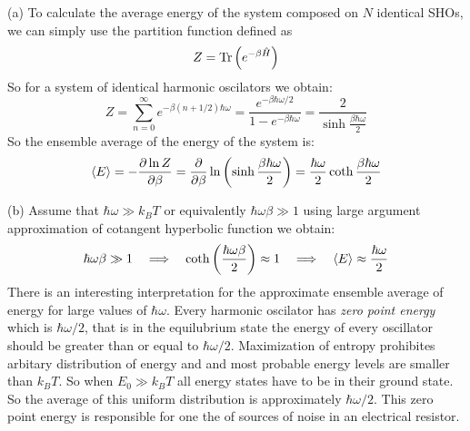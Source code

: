 \begin{homeworkProblem}

\begin{homeworkSection}{(a)}
To calculate the average energy of the system composed on $N$ identical SHOs, we can simply use the partition function defined as 
\begin{equation*}
Z=\operatorname{Tr}\left(e^{-\beta\Hat{H}}\right)
\end{equation*}
So for a system of identical harmonic oscilators we obtain:
\begin{equation}
Z=\sum_{n=0}^{\infty}e^{-\beta (n+1/2)\hbar \omega}=\frac{e^{-\beta \hbar \omega/2}}{1-e^{-\beta \hbar \omega}}
=\frac{2}{\sinh\frac{\beta\hbar\omega}{2}}
\end{equation} 
So the ensemble average of the energy of the system is:
\begin{equation}
\langle E\rangle=-\dfrac{\partial \ln Z}{\partial \beta}=\frac{\partial}{\partial \beta}\ln\left(\sinh\frac{\beta\hbar\omega}{2}\right)=\frac{\hbar\omega}{2}\coth\frac{\beta\hbar\omega}{2}
\end{equation} 

\end{homeworkSection}
\begin{homeworkSection}{(b)}
Assume that $\hbar\omega\gg k_BT$ or equivalently $\hbar\omega\beta\gg 1$ using large argument approximation of cotangent hyperbolic function we obtain:
\begin{equation}
\hbar\omega\beta\gg 1\quad\Longrightarrow\quad \coth\left(\frac{\hbar\omega\beta}{2}\right)\approx 1\quad\Longrightarrow\quad \langle E\rangle \approx\frac{\hbar\omega}{2}
\end{equation} 
There is an interesting interpretation for the approximate ensemble average of energy for large values of $\hbar\omega$. Every harmonic oscilator has \textit{zero point energy} which is $\hbar\omega/2$, that is in the equilubrium state the energy of every oscillator should be greater than or equal to  $\hbar\omega/2$. Maximization of entropy prohibites arbitary distribution of energy and  and most probable energy levels are smaller than $k_BT$. So when $E_0\gg k_BT$ all energy states have to be in their ground state. So the average of this uniform distribution is approximately $\hbar\omega/2$. This zero point energy is responsible for one the of sources of noise in an electrical resistor.    
\\


\end{homeworkSection}
\end{homeworkProblem}
